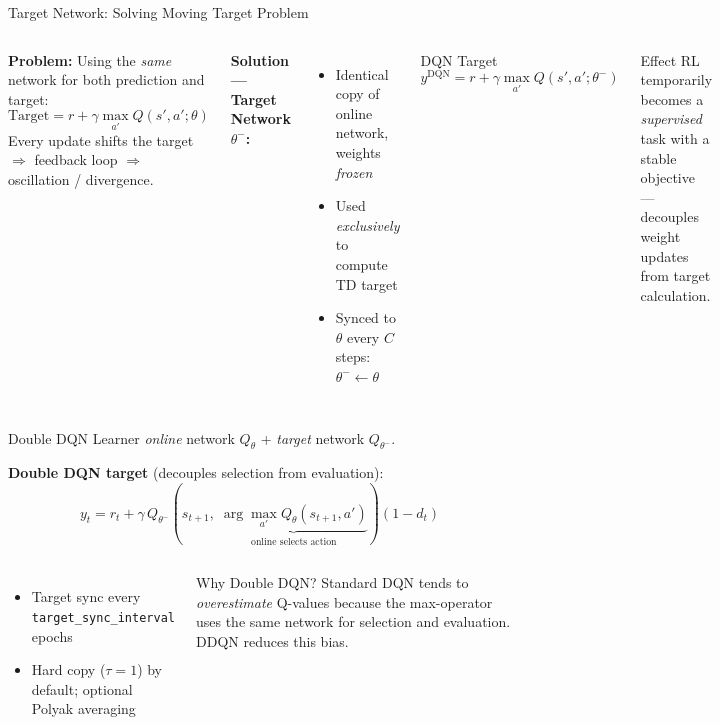 \documentclass[aspectratio=169]{beamer}
\begin{document}
\begin{frame}{Target Network: Solving Moving Target Problem}
  \begin{columns}[T]
      \textbf{Problem:} Using the \emph{same} network for both prediction and target:
      \[\text{Target} = r + \gamma\max_{a'}Q(s',a';\theta)\]
      Every update shifts the target $\Rightarrow$ feedback loop $\Rightarrow$ oscillation / divergence.

      \vspace{0.6em}
      \textbf{Solution — Target Network $\theta^-$:}
      \begin{itemize}
        \item Identical copy of online network, weights \emph{frozen}
        \item Used \emph{exclusively} to compute TD target
        \item Synced to $\theta$ every $C$ steps: $\theta^- \leftarrow \theta$
      \end{itemize}

      \begin{block}{DQN Target}
        \[y^{\text{DQN}} = r + \gamma\max_{a'}Q(s',a';\theta^-)\]
      \end{block}
      \vspace{0.4em}
      \begin{alertblock}{Effect}
        RL temporarily becomes a \emph{supervised} task with a stable objective — decouples weight updates from target calculation.
      \end{alertblock}
  \end{columns}
\end{frame}

\begin{frame}{Double DQN Learner}
  \emph{online} network $Q_\theta$ + \emph{target} network $Q_{\theta^-}$.

  \vspace{0.5em}
  \textbf{Double DQN target} (decouples selection from evaluation):
  \[y_t = r_t + \gamma\, Q_{\theta^-}\!\left(s_{t+1},\;\underbrace{\arg\max_{a'} Q_\theta(s_{t+1},a')}_{\text{online selects action}}\right)(1-d_t)\]

  \vspace{0.5em}
  \begin{columns}[T]
      \begin{itemize}
        \item Target sync every \texttt{target\_sync\_interval} epochs
        \item Hard copy ($\tau=1$) by default; optional Polyak averaging
      \end{itemize}
      \begin{alertblock}{Why Double DQN?}
        Standard DQN tends to \emph{overestimate} Q-values because the max-operator uses the same network for selection and evaluation. DDQN reduces this bias.
      \end{alertblock}
  \end{columns}
\end{frame}
\end{document}
